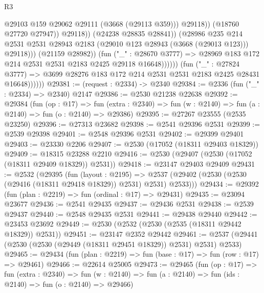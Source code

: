 \begin{lexlean}{R3}
\begin{coremodule}
                                            @29103
                                            @159
                                            @29062
                                            @29111
                                            (@3668 (@29113 @359)))
                                          @29118))
                                      (@18760 @27720 @27947))
                                    @29118))
                                (@24238 @28835 @28841))
                              (@28986
                                @235
                                @214
                                @2531
                                @2531
                                @28943
                                @2183
                                (@29010 @123 @28943 (@3668 (@29013 @123)))
                                @29118)))
                          (@21159 @28982))
                        (fun ("_" : @28670 @3777) =>
                        @28969 @183 @172 @214 @2531 @2531 @2183 @2425 @29118 @16648))))))
              (fun ("_" : @27824 @3777) =>
              @3699 @28276 @183 @172 @214 @2531 @2531 @2183 @2425 @28431 @16648))))))
@29381 := (request : @2334) -> @2340
@29384 := @2336 (fun ("_" : @2334) => @2340) @2147
@29386 := @2530 @21238 @22638
@29392 := @29384
    (fun (op : @17) =>
    fun (extra : @2340) => fun (w : @2140) => fun (a : @2140) => fun (o : @2140) => @29386)
@29395 := @27267 @23555 (@2535 @23250)
@29396 := @27313 @23682
@29398 := @2541 @29396 @2531
@29399 := @2539 @29398
@29401 := @2548 @29396 @2531
@29402 := @29399 @29401
@29403 := @23330 @2206
@29407 := @2530 (@17052 (@18311 @29403 @18329))
@29409 := @18315 @23288 @2210
@29416 := @2530 (@29407 (@2530 (@17052 (@18311 @29409 @18329)) @2531))
@29418 := @23147 @29403 @29409
@29431 := @2532
    (@29395
      (fun (layout : @2195) =>
      @2537 (@29402 (@2530 (@2530 (@29416 (@18311 @29418 @18329)) @2531) @2531) @2533)))
@29434 := @29392 (fun (plan : @2219) => fun (ordinal : @17) => @29431)
@29435 := @23094 @23677
@29436 := @2541 @29435
@29437 := @29436 @2531
@29438 := @2539 @29437
@29440 := @2548 @29435 @2531
@29441 := @29438 @29440
@29442 := @23453 @23692
@29449 := @2530 (@2532 (@2530 (@2535 (@18311 @29442 @18329)) @2531))
@29451 := @23147 @2352 @29442
@29461 := @2537 (@29441 (@2530 (@2530 (@29449 (@18311 @29451 @18329)) @2531) @2531) @2533)
@29465 := @29434 (fun (plan : @2219) => fun (base : @17) => fun (row : @17) => @29461)
@29466 := @22614 @25005
@29473 := @29465
    (fun (op : @17) =>
    fun (extra : @2340) =>
    fun (w : @2140) => fun (a : @2140) => fun (ids : @2140) => fun (o : @2140) => @29466)

\end{coremodule}
\end{lexlean}
